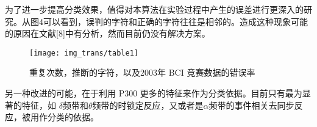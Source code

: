 \documentclass[a4paper]{ecust_thesis_translation}
\renewcommand\![1]{\immature{#1}}
\begin{document}
为了进一步提高分类效果，值得对本算法在实验过程中产生的误差进行更深入的研究。从图4可以看到，误判的字符和正确的字符往往是相邻的。造成这种现象可能的原因在文献[8]中有分析，然而目前仍没有解决方案。
\begin{figure}[ht]
  \texttt{[image: img\_trans/table1]}
  \caption{重复次数，推断的字符，以及2003年 BCI 竞赛数据的错误率}
\end{figure}

另一种改进的可能，在于利用 P300 更多的特征来作为分类依据。目前只有最为显著的特征，如 $\delta$频带和$\theta$频带的时锁定反应，又或者是$\alpha$频带的事件相关去同步反应，被用作分类的依据。
\end{document}
